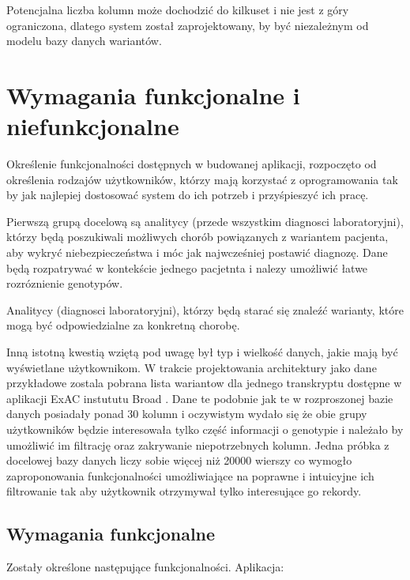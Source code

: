\documentclass[a4paper,12pt,twoside]{article}
\begin{document}
Potencjalna liczba kolumn może dochodzić do kilkuset
i nie jest z góry ograniczona, dlatego system został zaprojektowany, by być niezależnym od modelu bazy danych wariantów.
\newpage
\section{Wymagania funkcjonalne i niefunkcjonalne}  

Określenie funkcjonalności dostępnych w budowanej aplikacji, rozpoczęto od określenia 
rodzajów użytkowników, którzy mają korzystać z oprogramowania tak by jak najlepiej dostosować system do ich potrzeb i przyśpieszyć ich pracę.

Pierwszą grupą docelową są analitycy (przede wszystkim diagnosci laboratoryjni), którzy będą poszukiwali możliwych chorób powiązanych z wariantem pacjenta, aby wykryć niebezpieczeństwa i móc jak najwcześniej postawić diagnozę. 
Dane będą rozpatrywać w kontekście jednego pacjetnta i nalezy umożliwić łatwe rozróznienie genotypów.

Analitycy (diagnosci laboratoryjni), którzy będą starać się znaleźć warianty, które mogą być odpowiedzialne za konkretną chorobę. 

Inną istotną kwestią wziętą pod uwagę był typ i wielkość danych, jakie mają być wyświetlane użytkownikom.
W trakcie projektowania architektury jako dane przykładowe zostala pobrana lista wariantow dla jednego transkryptu dostępne w aplikacji ExAC instututu Broad \cite{exac} \cite{exacCite}. Dane te 
podobnie jak te w rozproszonej bazie danych posiadały ponad 30 kolumn i oczywistym wydało się że obie grupy użytkowników będzie interesowała tylko część informacji o genotypie i należało by umożliwić im filtrację oraz zakrywanie niepotrzebnych kolumn. 
Jedna próbka z docelowej bazy danych liczy sobie więcej niż 20000 wierszy co wymogło zaproponowania 
funkcjonalności umożliwiające na poprawne i intuicyjne ich filtrowanie 
tak aby użytkownik otrzymywał tylko interesujące go rekordy.

\newpage
\subsection{Wymagania funkcjonalne}
Zostały określone następujące funkcjonalności. Aplikacja:
\end{document}
